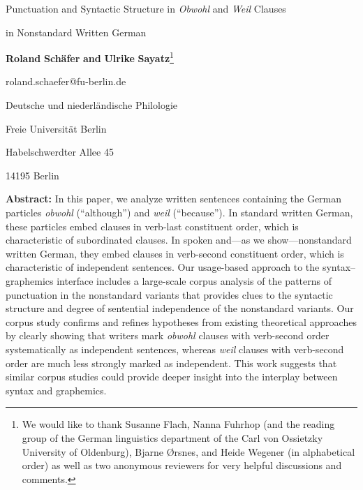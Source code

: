 

\begin{styleMoutonTitle}
Punctuation and Syntactic Structure in \textit{Obwohl} and \textit{Weil} Clauses
\end{styleMoutonTitle}

\begin{styleMoutonTitle}
in Nonstandard Written German
\end{styleMoutonTitle}

\begin{styleMoutonText}
\textbf{Roland} \textbf{Schäfer} \textbf{and} \textbf{Ulrike} \textbf{Sayatz}\footnote{We would like to thank Susanne Flach, Nanna Fuhrhop (and the reading group of the German linguistics department of the Carl von Ossietzky University of Oldenburg), Bjarne Ørsnes, and Heide Wegener (in alphabetical order) as well as two anonymous reviewers for very helpful discussions and comments.}
\end{styleMoutonText}

\begin{styleMoutonText}
roland.schaefer@fu-berlin.de
\end{styleMoutonText}

\begin{styleMoutonText}
Deutsche und niederländische Philologie
\end{styleMoutonText}

\begin{styleMoutonText}
Freie Universität Berlin
\end{styleMoutonText}

\begin{styleMoutonText}
Habelschwerdter Allee 45
\end{styleMoutonText}

\begin{styleMoutonText}
14195 Berlin
\end{styleMoutonText}

\begin{styleMoutonAbstract}
\textbf{Abstract:} In this paper, we analyze written sentences containing the German particles \textit{obwohl} (“although”) and \textit{weil} (“because”). In standard written German, these particles embed clauses in verb-last constituent order, which is characteristic of subordinated clauses. In spoken and—as we show—nonstandard written German, they embed clauses in verb-second constituent order, which is characteristic of independent sentences. Our usage-based approach to the syntax–graphemics interface includes a large-scale corpus analysis of the patterns of punctuation in the nonstandard variants that provides clues to the syntactic structure and degree of sentential independence of the nonstandard variants. Our corpus study confirms and refines hypotheses from existing theoretical approaches by clearly showing that writers mark \textit{obwohl} clauses with verb-second order systematically as independent sentences, whereas \textit{weil} clauses with verb-second order are much less strongly marked as independent. This work suggests that similar corpus studies could provide deeper insight into the interplay between syntax and graphemics.
\end{styleMoutonAbstract}

